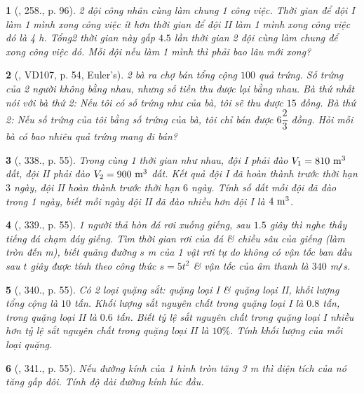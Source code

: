 \documentclass{article}
\newtheorem{baitoan}{}
\begin{document}
\begin{baitoan}[\cite{Tuyen_Toan_9_old}, 258., p. 96]
	2 đội công nhân cùng làm chung 1 công việc. Thời gian để đội I làm 1 mình xong công việc ít hơn thời gian để đội II làm 1 mình xong công việc đó là {\rm4 h}. Tổng2 thời gian này gấp $4.5$ lần thời gian 2 đội cùng làm chung để xong công việc đó. Mỗi đội nếu làm 1 mình thì phải bao lâu mới xong?
\end{baitoan}

\begin{baitoan}[\cite{Binh_Toan_9_tap_2}, VD107, p. 54, Euler's]
	2 bà ra chợ bán tổng cộng $100$ quả trứng. Số trứng của 2 người không bằng nhau, nhưng số tiền thu được lại bằng nhau. Bà thứ nhất nói với bà thứ 2: Nếu tôi có số trứng như của bà, tôi sẽ thu được $15$ đồng. Bà thứ 2: Nếu số trứng của tôi bằng số trứng của bà, tôi chỉ bán được $6\dfrac{2}{3}$ đồng. Hỏi mỗi bà có bao nhiêu quả trứng mang đi bán?
\end{baitoan}

\begin{baitoan}[\cite{Binh_Toan_9_tap_2}, 338., p. 55]
	Trong cùng 1 thời gian như nhau, đội I phải đào $V_1 = 810\ {\rm m}^3$ đất, đội II phải đào $V_2 = 900\ {\rm m}^3$ đất. Kết quả đội I đã hoàn thành trước thời hạn $3$ ngày, đội II hoàn thành trước thời hạn $6$ ngày. Tính số đất mỗi đội đã đào trong 1 ngày, biết mỗi ngày đội II đã đào nhiều hơn đội I là $\rm4\ m^3$.
\end{baitoan}

\begin{baitoan}[\cite{Binh_Toan_9_tap_2}, 339., p. 55]
	1 người thả hòn đá rơi xuống giếng, sau $1.5$ giây thì nghe thấy tiếng đá chạm đáy giếng. Tìm thời gian rơi của đá \& chiều sâu của giếng (làm tròn đến {\rm m}), biết quãng đường $s$ {\rm m} của 1 vật rơi tự do không có vận tốc ban đầu sau $t$ giây được tính theo công thức $s = 5t^2$ \& vận tốc của âm thanh là $340$ {\rm m{\tt/}s}.
\end{baitoan}

\begin{baitoan}[\cite{Binh_Toan_9_tap_2}, 340., p. 55]
	Có 2 loại quặng sắt: quặng loại I \& quặng loại II, khối lượng tổng cộng là $10$ tấn. Khối lượng sắt nguyên chất trong quặng loại I là $0.8$ tấn, trong quặng loại II là $0.6$ tấn. Biết tỷ lệ sắt nguyên chất trong quặng loại I nhiều hơn tỷ lệ sắt nguyên chất trong quặng loại II là $10\%$. Tính khối lượng của mỗi loại quặng.
\end{baitoan}

\begin{baitoan}[\cite{Binh_Toan_9_tap_2}, 341., p. 55]
	Nếu đường kính của 1 hình tròn tăng {\rm3 m} thì diện tích của nó tăng gấp đôi. Tính độ dài đường kính lúc đầu.
\end{baitoan}
\end{document}
